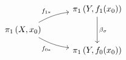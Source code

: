 \documentclass{article}
\begin{document}
    \begin{equation*}
        \begin{tikzcd}[column sep = 1cm, row sep=0.25cm]
            & \pi_1\l(Y,f_1\!\l(x_0\r)\r) \ar[dd, "\beta_\sigma"] \\
            \pi_1\l(X,x_0\r) \ar[ur, "f_{1\ast}", bend left=10] \ar[dr, "f_{0\ast}"', bend right=10] \\
            & \pi_1\l(Y,f_0\!\l(x_0\r)\r)
        \end{tikzcd}
    \end{equation*}
\end{document}
